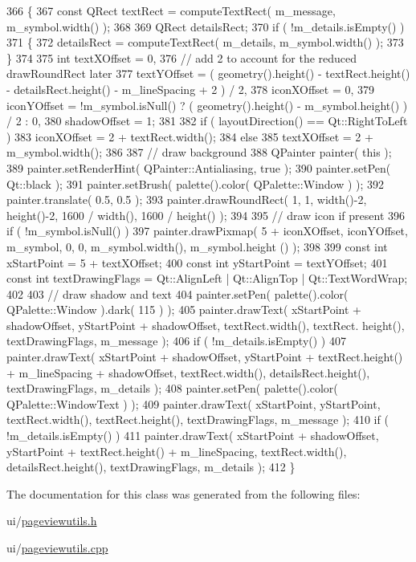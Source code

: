\begin{DoxyCode}
366 \{
367     \textcolor{keyword}{const} QRect textRect = computeTextRect( m\_message, m\_symbol.width() );
368 
369     QRect detailsRect;
370     \textcolor{keywordflow}{if} ( !m\_details.isEmpty() )
371     \{
372         detailsRect = computeTextRect( m\_details, m\_symbol.width() );
373     \}
374 
375     \textcolor{keywordtype}{int} textXOffset = 0,
376         \textcolor{comment}{// add 2 to account for the reduced drawRoundRect later}
377         textYOffset = ( geometry().height() - textRect.height() - detailsRect.height() - m\_lineSpacing + 2 
      ) / 2,
378         iconXOffset = 0,
379         iconYOffset = !m\_symbol.isNull() ? ( geometry().height() - m\_symbol.height() ) / 2 : 0,
380         shadowOffset = 1;
381 
382     \textcolor{keywordflow}{if} ( layoutDirection() == Qt::RightToLeft )
383         iconXOffset = 2 + textRect.width();
384     \textcolor{keywordflow}{else}
385         textXOffset = 2 + m\_symbol.width();
386 
387     \textcolor{comment}{// draw background}
388     QPainter painter( \textcolor{keyword}{this} );
389     painter.setRenderHint( QPainter::Antialiasing, \textcolor{keyword}{true} );
390     painter.setPen( Qt::black );
391     painter.setBrush( palette().color( QPalette::Window ) );
392     painter.translate( 0.5, 0.5 );
393     painter.drawRoundRect( 1, 1, width()-2, height()-2, 1600 / width(), 1600 / height() );
394 
395     \textcolor{comment}{// draw icon if present}
396     \textcolor{keywordflow}{if} ( !m\_symbol.isNull() )
397         painter.drawPixmap( 5 + iconXOffset, iconYOffset, m\_symbol, 0, 0, m\_symbol.width(), m\_symbol.height
      () );
398 
399     \textcolor{keyword}{const} \textcolor{keywordtype}{int} xStartPoint = 5 + textXOffset;
400     \textcolor{keyword}{const} \textcolor{keywordtype}{int} yStartPoint = textYOffset;
401     \textcolor{keyword}{const} \textcolor{keywordtype}{int} textDrawingFlags = Qt::AlignLeft | Qt::AlignTop | Qt::TextWordWrap;
402 
403     \textcolor{comment}{// draw shadow and text}
404     painter.setPen( palette().color( QPalette::Window ).dark( 115 ) );
405     painter.drawText( xStartPoint + shadowOffset, yStartPoint + shadowOffset, textRect.width(), textRect.
      height(), textDrawingFlags, m\_message );
406     \textcolor{keywordflow}{if} ( !m\_details.isEmpty() )
407         painter.drawText( xStartPoint + shadowOffset, yStartPoint + textRect.height() + m\_lineSpacing + 
      shadowOffset, textRect.width(), detailsRect.height(), textDrawingFlags, m\_details );
408     painter.setPen( palette().color( QPalette::WindowText ) );
409     painter.drawText( xStartPoint, yStartPoint, textRect.width(), textRect.height(), textDrawingFlags, 
      m\_message );
410     \textcolor{keywordflow}{if} ( !m\_details.isEmpty() )
411         painter.drawText( xStartPoint + shadowOffset, yStartPoint + textRect.height() + m\_lineSpacing, 
      textRect.width(), detailsRect.height(), textDrawingFlags, m\_details );
412 \}
\end{DoxyCode}


The documentation for this class was generated from the following files\+:\begin{DoxyCompactItemize}
\item 
ui/\hyperlink{pageviewutils_8h}{pageviewutils.\+h}\item 
ui/\hyperlink{pageviewutils_8cpp}{pageviewutils.\+cpp}\end{DoxyCompactItemize}
